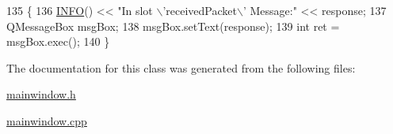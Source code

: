 \begin{DoxyCode}
135 \{
136     \hyperlink{Log_8h_a7cec51f4ce4b22e8c0f256485d57fca7}{INFO}() << \textcolor{stringliteral}{"In slot \(\backslash\)'receivedPacket\(\backslash\)' Message:"} << response;
137     QMessageBox msgBox;
138     msgBox.setText(response);
139     \textcolor{keywordtype}{int} ret = msgBox.exec();
140 \}
\end{DoxyCode}


The documentation for this class was generated from the following files\-:\begin{DoxyCompactItemize}
\item 
\hyperlink{mainwindow_8h}{mainwindow.\-h}\item 
\hyperlink{mainwindow_8cpp}{mainwindow.\-cpp}\end{DoxyCompactItemize}
